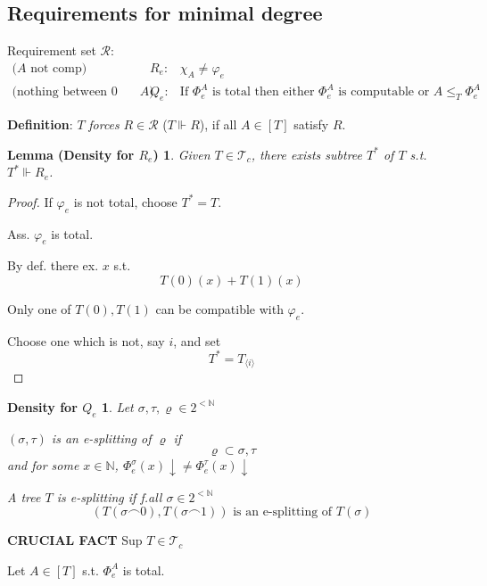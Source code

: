 \documentclass[12pt]{article}
\newcommand{\Nat}{\ensuremath{\mathbb{N}}}
\newcommand{\defn}{\textbf{Definition}: }
\begin{document}
\subsection{Requirements for minimal degree}

Requirement set $\mathcal{R}$:
\begin{align*}
\text{($A$ not comp) }  
  &R_e:& \chi_A \ne \varphi_e \\
\text{(nothing between 0 and $A$) }  
  &Q_e:& \text{If } \Phi^A_e \text{ is total then either }
        \Phi^A_e \text{ is computable or } A \le_T \Phi^A_e
\end{align*}

\newcommand{\forces}{\Vdash}
\defn $T$ \emph{forces} $R \in \mathcal{R}$ ($T \forces R$), 
if all $A \in [T]$ satisfy $R$.

\newtheorem*{densitylem}{Lemma (Density for $R_e$)}
\begin{densitylem}
  Given $T \in \mathcal{T}_c$, there exists subtree $T^*$ of $T$
  s.t. $T^* \forces R_e$.
\end{densitylem}
\begin{proof}
  If $\varphi_e$ is not total, choose $T^* = T$.

  Ass. $\varphi_e$ is total.

  By def. there ex. $x$ s.t.
  \[
      T(0)    (x) + T(1)(x)
  \] %

  Only one of $T(0), T(1)$ can be compatible with $\varphi_e$.

  Choose one which is not, say $i$, and set
  \[
  T^* = T_{\langle i\rangle} %
  \]
\end{proof}

\newtheorem*{densityqe}{Density for $Q_e$}
\begin{densityqe}
  Let $\sigma,\tau,\varrho \in 2^{<\Nat}$

  $(\sigma,\tau)$ is an \emph{e-splitting} of $\varrho$ if
  \[
  \varrho \subset \sigma,\tau
  \]
  and for some $ x \in \Nat$, 
  $\Phi^\sigma_e(x)\downarrow \ne \Phi^\tau_e(x)\downarrow$


  A tree $T$ is \emph{e-splitting} if f.all $\sigma\in 2^{<\Nat}$
  \[
       \left(
        T(\sigma\frown 0), T(\sigma\frown 1)
        \right) \text{ is an e-splitting of $T(\sigma)$}
  \]
\end{densityqe}

\textbf{CRUCIAL FACT}
Sup $T \in \mathcal{T}_c$

Let $A \in [T]$ s.t. $\Phi^A_e$ is  total.
\end{document}
